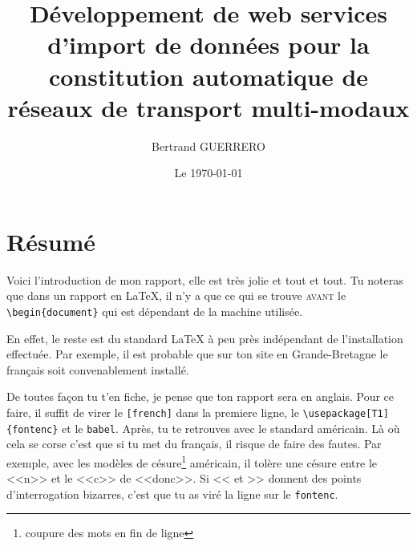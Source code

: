 \documentclass[french,12pt, a4paper,twoside,openright]{report}
\begin{document}
\title{Développement de web services 
d’import de données pour la constitution automatique 
de réseaux de transport multi-modaux}
\author{Bertrand \textsc{GUERRERO}}
\date{Le \today}


\maketitle                      %

\strut\thispagestyle{empty}     %
\vfill                          %
\pagebreak                      %

\setcounter{page}{1}            %

\tableofcontents

\chapter*{Résumé}

Voici l'introduction de mon rapport, elle est tr\`es jolie et tout et tout.
Tu noteras que dans un rapport en \LaTeX{}, il n'y a que ce qui se trouve
\textsc{avant} le \verb"\begin{document}" qui est d\'ependant de la machine
utilis\'ee.

En effet, le reste est du standard \LaTeX{} \`a peu pr\`es ind\'ependant de
l'installation effectu\'ee. Par exemple, il est probable que sur ton site en
Grande-Bretagne le fran\c{c}ais soit convenablement install\'e.

De toutes fa\c{c}on tu t'en fiche, je pense que ton rapport sera en anglais.
Pour ce faire, il suffit de virer le \verb"[french]" dans la premiere ligne,
le \verb"\usepackage[T1]{fontenc}" et le \verb"babel". Apr\`es, tu te retrouves
avec le standard am\'ericain. L\`a o\`u cela se corse c'est que si tu met du
fran\c{c}ais, il risque de faire des fautes. Par exemple, avec les mod\`eles
de c\'esure\footnote{coupure des mots en fin de ligne} am\'ericain, il tol\`ere
une c\'esure entre le <<n>> et le <<c>> de <<donc>>. Si << et >> donnent des
points d'interrogation bizarres, c'est que tu as vir\'e la ligne sur le
\verb"fontenc".
\end{document}
